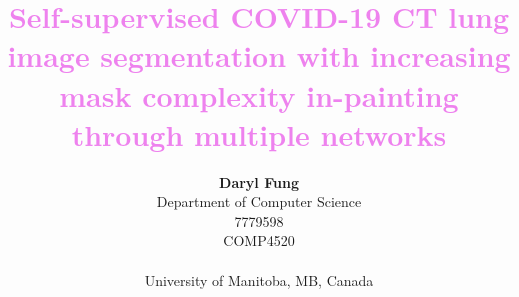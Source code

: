 \documentclass[journal]{IEEEtran}
\title{\textcolor{violet}{Self-supervised COVID-19 CT lung image segmentation with increasing mask complexity in-painting through multiple networks}}
\begin{document}

%
%

\author{\textbf{Daryl Fung}\\
Department of Computer Science \\
7779598 \\
COMP4520 \\
\vspace*{0.1cm}

\small
University of Manitoba, MB, Canada\\

\normalsize
	
}

% 
%
%
\end{document}
